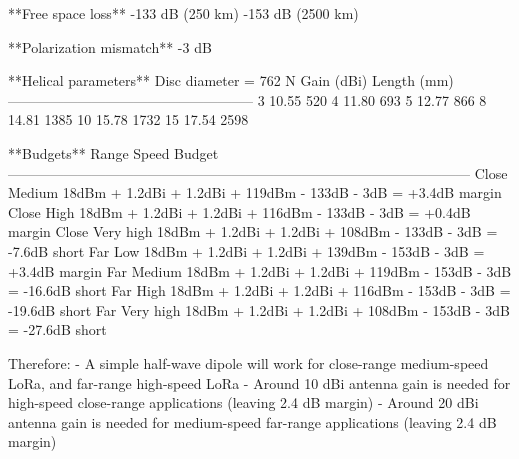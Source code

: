 **Free space loss**
-133 dB (250 km)
-153 dB (2500 km)

**Polarization mismatch**
-3 dB

**Helical parameters**
Disc diameter = 762
N               Gain (dBi)          Length (mm)
-----------------------------------------------------
3               10.55               520
4               11.80               693
5               12.77               866
8               14.81               1385
10              15.78               1732
15              17.54               2598

**Budgets**
Range           Speed               Budget
---------------------------------------------------------------------------------------------------
Close           Medium              18dBm + 1.2dBi + 1.2dBi + 119dBm - 133dB - 3dB = +3.4dB margin
Close           High                18dBm + 1.2dBi + 1.2dBi + 116dBm - 133dB - 3dB = +0.4dB margin
Close           Very high           18dBm + 1.2dBi + 1.2dBi + 108dBm - 133dB - 3dB = -7.6dB short
Far             Low                 18dBm + 1.2dBi + 1.2dBi + 139dBm - 153dB - 3dB = +3.4dB margin
Far             Medium              18dBm + 1.2dBi + 1.2dBi + 119dBm - 153dB - 3dB = -16.6dB short
Far             High                18dBm + 1.2dBi + 1.2dBi + 116dBm - 153dB - 3dB = -19.6dB short
Far             Very high           18dBm + 1.2dBi + 1.2dBi + 108dBm - 153dB - 3dB = -27.6dB short

Therefore:
- A simple half-wave dipole will work for close-range medium-speed LoRa, and far-range high-speed LoRa
- Around 10 dBi antenna gain is needed for high-speed close-range applications (leaving 2.4 dB margin)
- Around 20 dBi antenna gain is needed for medium-speed far-range applications (leaving 2.4 dB margin)